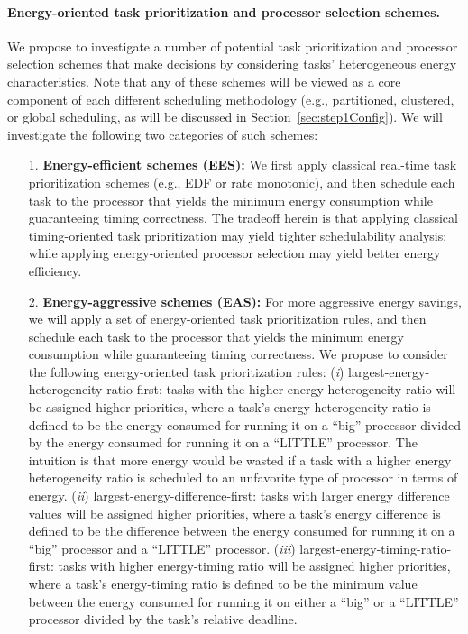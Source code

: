 \paragraph{Energy-oriented task prioritization and processor selection schemes.} We propose to investigate a number of potential task prioritization and processor selection schemes that make decisions by considering tasks' heterogeneous energy characteristics. Note that any of these schemes will be viewed as a core component of each different scheduling methodology (e.g., partitioned, clustered, or global scheduling, as will be discussed  in Section~\ref{sec:step1Config}). We will investigate the following two categories of such schemes:

\begin{itemize}
\item[1.] \textbf{Energy-efficient schemes (EES):} We first apply classical real-time task prioritization schemes (e.g., EDF or rate monotonic), and then schedule each task to the processor that yields the minimum energy consumption while guaranteeing timing correctness. The tradeoff herein is that applying classical timing-oriented task prioritization may yield tighter schedulability analysis; while applying energy-oriented processor selection may yield better energy efficiency.
\item[2.] \textbf{Energy-aggressive schemes (EAS):} For more aggressive energy savings, we will apply a set of energy-oriented task prioritization rules, and then schedule each task to the processor that yields the minimum energy consumption while guaranteeing timing correctness. We propose to consider the following energy-oriented task prioritization rules: (\textit{i}) largest-energy-heterogeneity-ratio-first: tasks with the higher energy heterogeneity ratio will be assigned higher priorities, where a task's energy heterogeneity ratio is defined to be  the energy consumed for running it on a ``big'' processor divided by the energy consumed for running it on a ``LITTLE'' processor. The intuition is that more energy would be wasted if a task with a higher energy heterogeneity ratio is scheduled to an unfavorite type of processor in terms of energy. (\textit{ii}) largest-energy-difference-first: tasks with larger energy difference values will be assigned higher priorities, where a task's energy difference is defined to be the difference between the energy consumed for running it on a ``big'' processor and a ``LITTLE'' processor. (\textit{iii}) largest-energy-timing-ratio-first: tasks with higher energy-timing ratio will be assigned higher priorities, where a task's energy-timing ratio is defined to be the minimum value between the energy consumed for running it on either a ``big'' or a ``LITTLE'' processor divided by the task's relative deadline.
\end{itemize}

